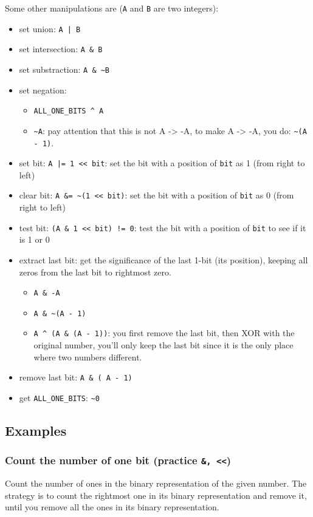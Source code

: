 \documentclass[12pt]{article}
\begin{document}
Some other manipulations are (\texttt{A} and \texttt{B} are two integers):
\begin{itemize}
\item set union: \texttt{A | B}
\item set intersection: \texttt{A \& B}
\item set substraction: \texttt{A \& \textasciitilde{}B}
\item set negation:
\begin{itemize}
\item \texttt{ALL\_ONE\_BITS \textasciicircum{} A}
\item \texttt{\textasciitilde{}A}: pay attention that this is not A -> -A, to make A -> -A, you do: \texttt{\textasciitilde{}(A - 1)}.
\end{itemize}
\item set bit: \texttt{A |= 1 << bit}: set the bit with a position of \texttt{bit} as 1 (from right to left)
\item clear bit: \texttt{A \&= \textasciitilde{}(1 << bit)}: set the bit with a position of \texttt{bit} as 0 (from right to left)
\item test bit: \texttt{(A \& 1 << bit) != 0}: test the bit with a position of \texttt{bit} to see if it is 1 or 0
\item extract last bit: get the significance of the last 1-bit (its position), keeping all zeros from the last bit to rightmost zero.
\begin{itemize}
\item \texttt{A \& -A}
\item \texttt{A \& \textasciitilde{}(A - 1)}
\item \texttt{A \textasciicircum{} (A \& (A - 1))}: you first remove the last bit, then XOR with the original number, you'll only keep the last bit since it is the only place where two numbers different.
\end{itemize}
\item remove last bit: \texttt{A \& ( A - 1)}
\item get \texttt{ALL\_ONE\_BITS}: \texttt{\textasciitilde{}0}
\end{itemize}
\subsection{Examples}
\label{sec:orgd6ca303}
\subsubsection{Count the number of one bit (practice \texttt{\&, <<})}
\label{sec:org579cf2c}
Count the number of ones in the binary representation of the given number. The strategy is to count the rightmost one in its binary representation and remove it, until you remove all the ones in its binary representation.
\end{document}
